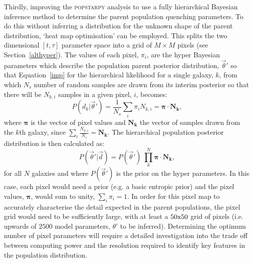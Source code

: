 Thirdly, improving the \textsc{popstarpy} analysis to use a fully hierarchical Bayesian inference method to determine the parent population quenching parameters. To do this without inferring a distribution for the unknown shape of the parent distribution, `heat map optimisation' can be employed. This splits the two dimensional $[t, \tau]$ parameter space into a grid of $M \times M$ pixels (see Section~\ref{althyper}). The values of each pixel, $\pi_i$, are the hyper Bayesian parameters which describe the population parent posterior distribution, $\vec{\theta}'$ so that Equation~\ref{imp} for the hierarchical likelihood for a single galaxy, $k$, from which $N_s$ number of random samples are drawn from its interim posterior so that there will be $N_{k,i}$ samples in a given pixel, $i$, becomes:
\begin{equation}\label{eq:heatmap}
P(d_k|\vec{\theta}')  = \frac{1}{N_s} \sum_i \pi_i N_{k,i} = \boldsymbol{\pi} \cdot \boldsymbol{N_k},
\end{equation}
where $\boldsymbol{\pi}$ is the vector of pixel values and $\boldsymbol{N_k}$ the vector of samples drawn from the $k$th galaxy, since $\sum_i \frac{N_{k,i}}{N_s} = \boldsymbol{N_k}$. The hierarchical population posterior distribution is then calculated as:
\begin{equation}\label{eq:parentdist}
P(\vec{\theta}'|\vec{d}) = P(\vec{\theta}')~\prod_k^N \boldsymbol{\pi} \cdot \boldsymbol{N_k},
\end{equation}
for all $N$ galaxies and where $P(\vec{\theta}')$ is the prior on the hyper parameters. In this case, each pixel would need a prior (e.g. a basic entropic prior) and the pixel values, $\boldsymbol{\pi}$, would sum to unity, $\sum_i \pi_i = 1$. In order for this pixel map to accurately characterise the detail expected in the parent populations, the pixel grid would need to be sufficiently large, with at least a $50\rm{x}50$ grid of pixels (i.e. upwards of $2500$ model parameters, $\theta'$ to be inferred). Determining the optimum number of pixel parameters will require a detailed investigation into the trade off between computing power and the resolution required to identify key features in the population distribution. 

